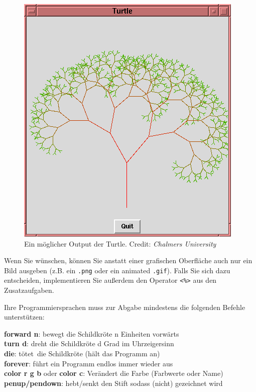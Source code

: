 \documentclass[10pt,a4paper]{article}
\begin{document}
\begin{figure}
  \vspace{-22pt}
  \begin{center}
    \includegraphics[scale=0.35]{turtle-tree.png} 
  \end{center}
  \vspace{-10pt}
  \caption{Ein möglicher Output der Turtle. Credit: \emph{Chalmers University}}

\end{figure}

Wenn Sie wünschen, können Sie anstatt einer grafischen Oberfläche auch nur ein Bild ausgeben (z.B. ein \texttt{.png} oder ein animated \texttt{.gif}). Falls Sie sich dazu entscheiden, implementieren Sie außerdem den Operator \texttt{<\%>} aus den Zusatzaufgaben.\smallskip

Ihre Programmiersprachen muss zur Abgabe mindestens die folgenden Befehle unterstützen:
\smallskip\smallskip

\textbf{forward n}: bewegt die Schildkröte n Einheiten vorwärts\\
\textbf{turn d}: dreht die Schildkröte d Grad im Uhrzeigersinn\\
\textbf{die}: \glqq tötet\grqq\ die Schildkröte (hält das Programm an)\\
\textbf{forever}: führt ein Programm endlos immer wieder aus\\
\textbf{color r g b} oder \textbf{color c}: Verändert die Farbe (Farbwerte oder Name)\\
\textbf{penup/pendown}: hebt/senkt den Stift sodass (nicht) gezeichnet wird
\smallskip
\end{document}

